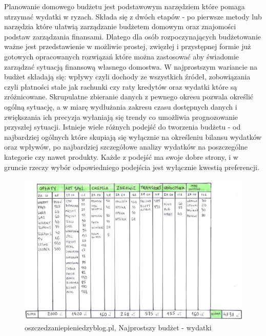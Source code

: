\documentclass[a4paper,10pt, twoside]{report}
\begin{document}
\begin{large}
{Planowanie domowego budżetu jest podstawowym narzędziem które pomaga utrzymać 
wydatki w ryzach. Składa się z dwóch etapów - po pierwsze metody lub narzędzia 
które ułatwią zarządzanie budżetem domowym oraz znajomości podstaw zarządzania 
finansami. Dlatego dla osób rozpoczynających budżetowanie ważne jest 
przedstawienie w możliwie prostej, zwięzłej i przystępnej formie już gotowych 
opracowanych rozwiązań które można zastosować aby świadomie zarządzać sytuacją 
finansową własnego domostwa. W najprostszym wariancie na 
budżet 
\cite{o24_budzetowanie}\cite{budget}\cite{iwućbudżet}\cite{mintbudget}\cite{ingbudżet}\cite{budzetdomowypodkontrola}
 składają się: wpływy czyli dochody ze wszystkich źródeł, zobowiązania czyli 
płatności stałe jak rachunki czy raty kredytów oraz wydatki które są 
zróżnicowane. Skrupulatne zbieranie danych z pewnego okresu pozwala określić 
ogólną sytuację, a w miarę wydłużania zakresu czasu dostępnych danych i 
zwiększania ich precyzja wyłaniają się trendy co umożliwia prognozowanie 
przyszłej sytuacji. Istnieje wiele różnych podejść do tworzenia budżetu - od 
najbardziej ogólnych które skupiają się wyłącznie na określeniu bilansu wydatków
 oraz wpływów, po najbardziej szczegółowe analizy wydatków na poszczególne 
kategorie czy nawet produkty. Każde z podejść ma swoje dobre strony, i w gruncie
 rzeczy wybór odpowiedniego podejścia jest wyłącznie kwestią preferencji.}

\begin{figure}[H]           %
    \centering
    \includegraphics[width=12cm]{figures/oszczedzaniepieniedzyblog-pl_wydatki.jpg}
    \caption{oszczedzaniepieniedzyblog.pl, Najprostszy budżet - wydatki}
    \label{fig:prostybudżetwydatki}
\end{figure}


\end{large}
\end{document}
